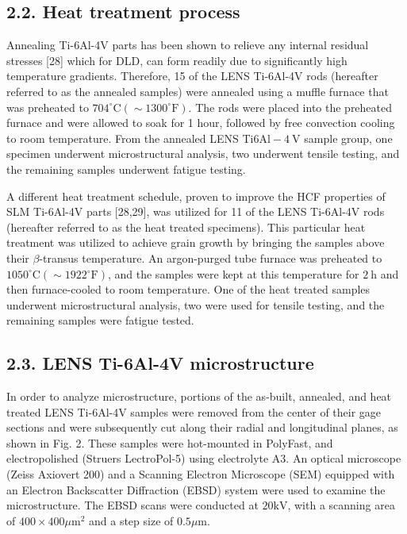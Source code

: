 \documentclass[10pt]{article}
\begin{document}
\subsection*{2.2. Heat treatment process}
Annealing Ti-6Al-4V parts has been shown to relieve any internal residual stresses [28] which for DLD, can form readily due to significantly high temperature gradients. Therefore, 15 of the LENS Ti-6Al-4V rods (hereafter referred to as the annealed samples) were annealed using a muffle furnace that was preheated to $704^{\circ} \mathrm{C}\left(\sim 1300^{\circ} \mathrm{F}\right)$. The rods were placed into the preheated furnace and were allowed to soak for 1 hour, followed by free convection cooling to room temperature. From the annealed LENS Ti$6 \mathrm{Al}-4 \mathrm{~V}$ sample group, one specimen underwent microstructural analysis, two underwent tensile testing, and the remaining samples underwent fatigue testing.

A different heat treatment schedule, proven to improve the HCF properties of SLM Ti-6Al-4V parts [28,29], was utilized for 11 of the LENS Ti-6Al-4V rods (hereafter referred to as the heat treated specimens). This particular heat treatment was utilized to achieve grain growth by bringing the samples above their $\beta$-transus temperature. An argon-purged tube furnace was preheated to $1050^{\circ} \mathrm{C}\left(\sim 1922{ }^{\circ} \mathrm{F}\right)$, and the samples were kept at this temperature for $2 \mathrm{~h}$ and then furnace-cooled to room temperature. One of the heat treated samples underwent microstructural analysis, two were used for tensile testing, and the remaining samples were fatigue tested.

\subsection*{2.3. LENS Ti-6Al-4V microstructure}
In order to analyze microstructure, portions of the as-built, annealed, and heat treated LENS Ti-6Al-4V samples were removed from the center of their gage sections and were subsequently cut along their radial and longitudinal planes, as shown in Fig. 2. These samples were hot-mounted in PolyFast, and electropolished (Struers LectroPol-5) using electrolyte A3. An optical microscope (Zeiss Axiovert 200) and a Scanning Electron Microscope (SEM) equipped with an Electron Backscatter Diffraction (EBSD) system were used to examine the microstructure. The EBSD scans were conducted at $20 \mathrm{kV}$, with a scanning area of $400 \times 400 \mu \mathrm{m}^{2}$ and a step size of $0.5 \mu \mathrm{m}$.
\end{document}
